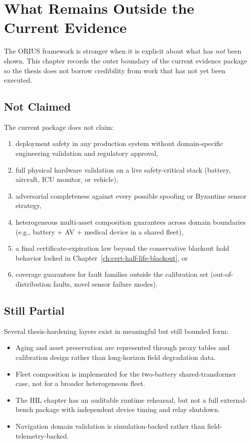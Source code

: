 \section{What Remains Outside the Current Evidence}
\label{ch:outside-current-evidence}

The ORIUS framework is stronger when it is explicit about what has \emph{not}
been shown.  This chapter records the outer boundary of the current evidence
package so the thesis does not borrow credibility from work that has not yet
been executed.

\subsection{Not Claimed}

The current package does not claim:

\begin{enumerate}
  \item deployment safety in any production system without domain-specific
    engineering validation and regulatory approval,
  \item full physical hardware validation on a live safety-critical stack
    (battery, aircraft, ICU monitor, or vehicle),
  \item adversarial completeness against every possible spoofing or
    Byzantine sensor strategy,
  \item heterogeneous multi-asset composition guarantees across domain
    boundaries (e.g., battery + AV + medical device in a shared fleet),
  \item a final certificate-expiration law beyond the conservative blackout
    hold behavior locked in Chapter~\ref{ch:cert-half-life-blackout}, or
  \item coverage guarantees for fault families outside the calibration set
    (out-of-distribution faults, novel sensor failure modes).
\end{enumerate}

\subsection{Still Partial}

Several thesis-hardening layers exist in meaningful but still bounded form:

\begin{itemize}
  \item Aging and asset preservation are represented through proxy tables and
    calibration design rather than long-horizon field degradation data.
  \item Fleet composition is implemented for the two-battery shared-transformer
    case, not for a broader heterogeneous fleet.
  \item The HIL chapter has an auditable runtime rehearsal, but not a full
    external-bench package with independent device timing and relay shutdown.
  \item Navigation domain validation is simulation-backed rather than
    field-telemetry-backed.
\end{itemize}

